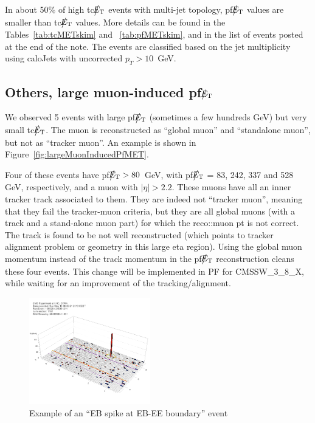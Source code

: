 In about 50\% of high tc$\big\slash\hspace{-1.6ex}{E_\text{T}}$ events with multi-jet topology, pf$\big\slash\hspace{-1.6ex}{E_\text{T}}$ values are 
smaller than tc$\big\slash\hspace{-1.6ex}{E_\text{T}}$ values. More details can be found in 
the Tables~\ref{tab:tcMETskim} and ~\ref{tab:pfMETskim}, and in the list of events posted at the end of the note.
The events are classified based on the jet multiplicity using caloJets with uncorrected $p_T>10$~GeV.

\subsection{Others, large muon-induced pf$\big\slash\hspace{-1.6ex}{E_\text{T}}$}
We observed 5 events with large pf$\big\slash\hspace{-1.6ex}{E_\text{T}}$ (sometimes a few hundreds GeV) 
but very small tc$\big\slash\hspace{-1.6ex}{E_\text{T}}$. 
The muon is reconstructed as ``global muon'' and ``standalone muon'', 
but not as ``tracker muon''. An example is shown in Figure~\ref{fig:largeMuonInducedPfMET}.

Four of these events have pf$\big\slash\hspace{-1.6ex}{E_\text{T}}>80$~GeV, with pf$\big\slash\hspace{-1.6ex}{E_\text{T}}$ = 83, 242, 337
and 528 GeV, respectively, and a muon with $|\eta| > 2.2$. 
These muons have all an inner tracker track associated to them. 
They are indeed not ``tracker muon'', meaning that they fail the tracker-muon
criteria, but they are all global muons (with a track and a stand-alone
muon part) for which the reco::muon pt is not correct. The track is found to be
not well reconstructed (which points to tracker alignment problem or geometry in this large eta region).
Using the global muon momentum instead of the track momentum in the pf$\big\slash\hspace{-1.6ex}{E_\text{T}}$ reconstruction
cleans these four events. This change will be implemented in PF for CMSSW\_3\_8\_X, 
while waiting for an improvement of the tracking/alignment.


%
\begin{figure}[h]
 \centering
   \includegraphics[width=0.47\textwidth]{fig/EBspikeAtBorder.png} 
\caption{Example of an ``EB spike at EB-EE boundary'' event}
\label{fig:EBspikeAtBorder}
\end{figure}

